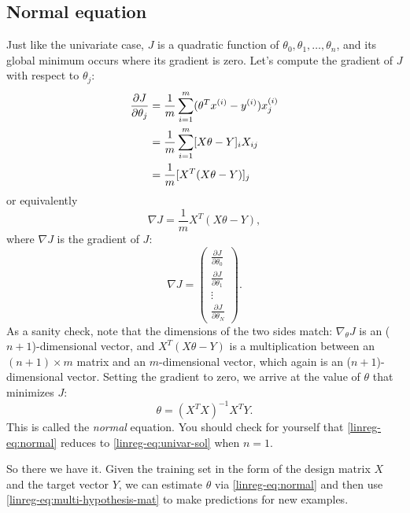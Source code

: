 \documentclass{article}
\theoremstyle{definition}
\begin{document}
\subsection{Normal equation}
\label{linreg-sec:normaleq}
Just like the univariate case, $J$ is a quadratic function of $\theta_0, \theta_1, \dots, \theta_n$, and its global minimum occurs where its gradient is zero. Let's compute the gradient of $J$ with respect to $\theta_j$:
\begin{align}
    \frac{\partial J}{\partial \theta_j} &= \frac{1}{m}\sum_{i=1}^{m}(\theta^Tx^{(i)} - y^{(i)})x^{(i)}_j\notag\\
    &=\frac{1}{m}\sum_{i=1}^{m}[X\theta - Y]_iX_{ij}\notag\\
    &=\frac{1}{m}[X^T(X\theta - Y)]_j
    \label{linreg-eq:costfunc-mat}
\end{align}
or equivalently
\begin{equation}
    \nabla J = \frac{1}{m}X^T(X\theta - Y),
    \label{linreg-eq:costfunc-nbala}
\end{equation}
where $\nabla J$ is the gradient of $J$:
\begin{equation}
    \nabla J =
    \begin{pmatrix}
        \frac{\partial J}{\partial \theta_0}\\
        \frac{\partial J}{\partial \theta_1}\\
        \vdots\\
        \frac{\partial J}{\partial \theta_N}
    \end{pmatrix}.
\end{equation}
As a sanity check, note that the dimensions of the two sides match: $\nabla_{\theta} J$ is an ($n+1$)-dimensional vector, and $X^T(X\theta - Y)$ is a multiplication between an $(n+1) \times m$ matrix and an $m$-dimensional vector, which again is an ($n+1$)-dimensional vector. Setting the gradient to zero, we arrive at the value of $\theta$ that minimizes $J$:
\begin{equation}
    \theta = \left(X^TX\right)^{-1}X^TY.
    \label{linreg-eq:normal}
\end{equation}
This is called the \textit{normal} equation. You should check for yourself that \eqref{linreg-eq:normal} reduces to \eqref{linreg-eq:univar-sol} when $n = 1$.

So there we have it. Given the training set in the form of the design matrix $X$ and the target vector $Y$, we can estimate $\theta$ via \eqref{linreg-eq:normal} and then use \eqref{linreg-eq:multi-hypothesis-mat} to make predictions for new examples.
\end{document}
